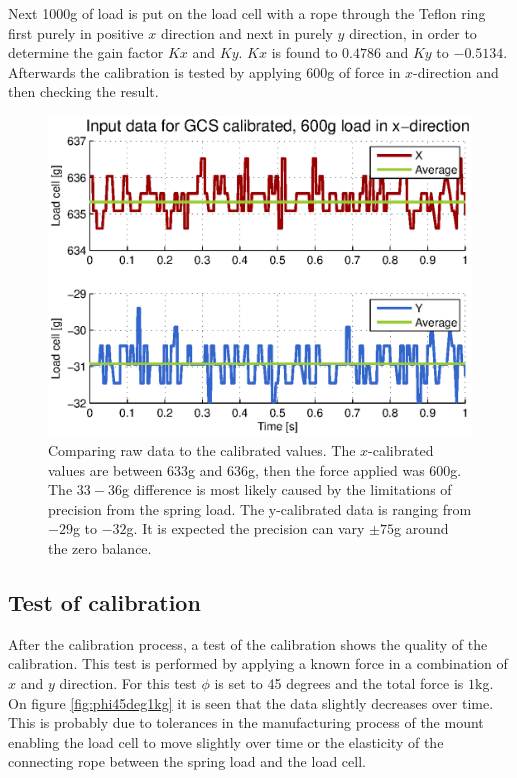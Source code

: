 \noindent
Next 1000g of load is put on the load cell with a rope through the Teflon ring first purely in positive $x$ direction and next in purely $y$ direction, in order to determine the gain factor $Kx$ and $Ky$. $Kx$ is found to $0.4786$ and $Ky$ to $-0.5134$. Afterwards the calibration is tested by applying $600$g of force in $x$-direction and then checking the result.

\begin{figure}[hbtp]
\centering
\includegraphics[scale=1]{graphics/gcs_test/calib_result_compare.eps}
\caption[Comparing raw data from load cells to the calibrated values]{Comparing raw data to the calibrated values. The $x$-calibrated values are between $633$g and $636$g, then the force applied was $600$g. The $33-36$g difference is most likely caused by the limitations of precision from the spring load. The y-calibrated data is ranging from $-29$g to $-32$g. It is expected the precision can vary $\pm75$g around the zero balance.}
\end{figure}

\newpage
\subsection{Test of calibration}
After the calibration process, a test of the calibration shows the quality of the calibration.
This test is performed by applying a known force in a combination of $x$ and $y$ direction. For this test $\phi$ is set to 45 degrees and the total force is $1$kg. On figure \ref{fig:phi45deg1kg} it is seen that the data slightly decreases over time. This is probably due to tolerances in the manufacturing process of the mount enabling the load cell to move slightly over time or the elasticity of the connecting rope between the spring load and the load cell.

